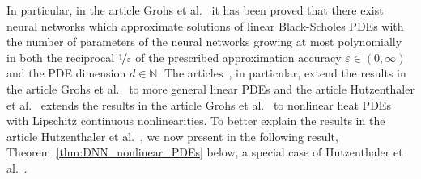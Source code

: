 \documentclass[12pt]{article}
\theoremstyle{definition}
\newcommand{\N}{\mathbb{N}}
\begin{document}
In particular, in the article Grohs et al.~\cite{grohs2018proof} it has been proved 
that there exist neural networks which approximate solutions of linear 
Black-Scholes PDEs with the number of parameters of the neural networks 
growing at most polynomially in both 
the reciprocal $ \nicefrac{ 1 }{ \varepsilon } $ 
of the prescribed approximation accuracy $ \varepsilon \in (0,\infty) $
and the PDE dimension $ d \in \N $. 
The articles~\cite{berner2018analysis,elbrachter2018dnn,gonon2019uniform,grohs2019deep,jentzen2018proofarxiv1809,kutyniok2019theoretical,reisinger2019rectified,HornungJentzenSalimova2020}, 
in particular, extend 
the results in the article Grohs et al.~\cite{grohs2018proof}
to more general linear PDEs and the article 
Hutzenthaler et al.~\cite{hutzenthaler2020proof} 
extends the results in the article Grohs et al.~\cite{grohs2018proof}
to nonlinear heat PDEs with Lipschitz continuous nonlinearities. 
To better explain the results in the article 
Hutzenthaler et al.~\cite{hutzenthaler2020proof}, 
we now present in the following result, 
Theorem~\ref{thm:DNN_nonlinear_PDEs} below, 
a special case of 
Hutzenthaler et 
al.~\cite[Theorem~1.1]{hutzenthaler2020proof}. 
%
%
%
\end{document}
